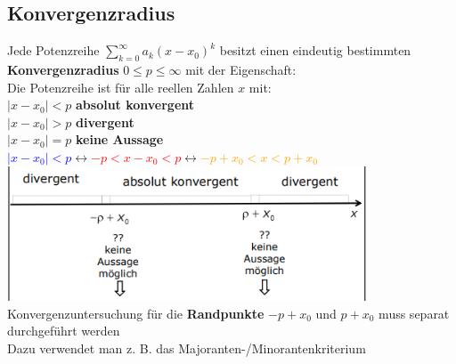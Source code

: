 \documentclass[12pt,a4paper]{article}
\begin{document}
\subsection{Konvergenzradius}
Jede Potenzreihe $\sum\limits_{k=0}^{\infty}a_k(x-x_0)^k$ besitzt einen eindeutig bestimmten 
\\\textbf{Konvergenzradius} $0\leq p\leq \infty$ mit der Eigenschaft:\\
Die Potenzreihe ist für alle reellen Zahlen $x$ mit:\\
$|x-x_0|<p$ \textbf{absolut konvergent}\\
$|x-x_0|>p$ \textbf{divergent}\\
$|x-x_0|=p$ \textbf{keine Aussage}\\
\textcolor{blue}{$|x-x_0|<p$}$\leftrightarrow$\textcolor{red}{$ -p<x-x_0<p$}$\leftrightarrow$\textcolor{orange}{$ -p+x_0<x<p+x_0$}\\
\includegraphics[width=0.8\textwidth]{Bilder/Zusfa/2.png}\\
Konvergenzuntersuchung für die \textbf{Randpunkte} $-p+x_0$ und $p+x_0$ muss separat durchgeführt werden\\
Dazu verwendet man z. B. das Majoranten-/Minorantenkriterium\\
\end{document}
